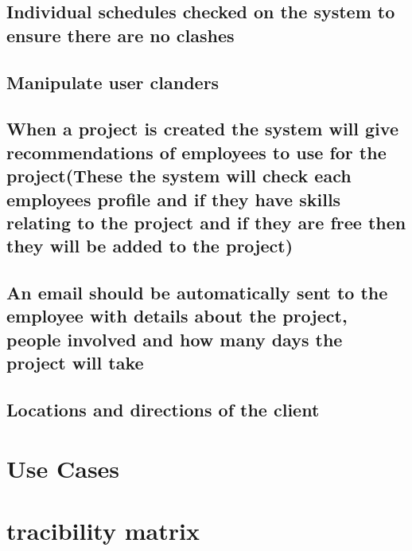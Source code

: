 \documentclass{article}
\begin{document}
	\subsection{Individual schedules checked on the system to ensure there are no clashes}
	\subsection{Manipulate user clanders}
	\subsection{When a project is created the system will give recommendations of employees to use for the project(These the system will check each employees profile and if they have skills relating to the project and if they are free then they will be added to the project)}
	\subsection{An email should be automatically sent to the employee with details about the project, people involved and how many days the project will take}
	\subsection{Locations and directions of the client}
  
  \section{Use Cases}
  \begin{paragraph}
  
  \end{paragraph}
  
  \section{tracibility matrix}
  \begin{paragraph}
  
  \end{paragraph}
  
\end{document}

